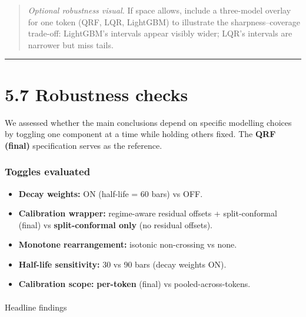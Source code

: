 \documentclass[
  a4paper,
  DIV=11,
  numbers=noendperiod]{scrreprt}
\makeatletter
\let\oldparagraph\paragraph
\renewcommand{\paragraph}{
    \@ifstar
      \xxxParagraphStar
      \xxxParagraphNoStar
  }
\newcommand{\xxxParagraphStar}[1]{\oldparagraph*{#1}\mbox{}}
\newcommand{\xxxParagraphNoStar}[1]{\oldparagraph{#1}\mbox{}}
\providecommand{\tightlist}{%
  \setlength{\itemsep}{0pt}\setlength{\parskip}{0pt}}
\makeatother
\begin{document}
\begin{quote}
\emph{Optional robustness visual.} If space allows, include a
three-model overlay for one token (QRF, LQR, LightGBM) to illustrate the
sharpness--coverage trade-off: LightGBM's intervals appear visibly
wider; LQR's intervals are narrower but miss tails.
\end{quote}

\begin{center}\rule{0.5\linewidth}{0.5pt}\end{center}

\section{5.7 Robustness checks}\label{robustness-checks}

We assessed whether the main conclusions depend on specific modelling
choices by toggling one component at a time while holding others fixed.
The \textbf{QRF (final)} specification serves as the reference.

\subsubsection{Toggles evaluated}\label{toggles-evaluated}

\begin{itemize}
\tightlist
\item
  \textbf{Decay weights:} ON (half-life = 60 bars) vs OFF.
\item
  \textbf{Calibration wrapper:} regime-aware residual offsets +
  split-conformal (final) vs \textbf{split-conformal only} (no residual
  offsets).
\item
  \textbf{Monotone rearrangement:} isotonic non-crossing vs none.
\item
  \textbf{Half-life sensitivity:} 30 vs 90 bars (decay weights ON).
\item
  \textbf{Calibration scope:} \textbf{per-token} (final) vs
  pooled-across-tokens.
\end{itemize}

\paragraph{Headline findings}\label{headline-findings}
\end{document}

